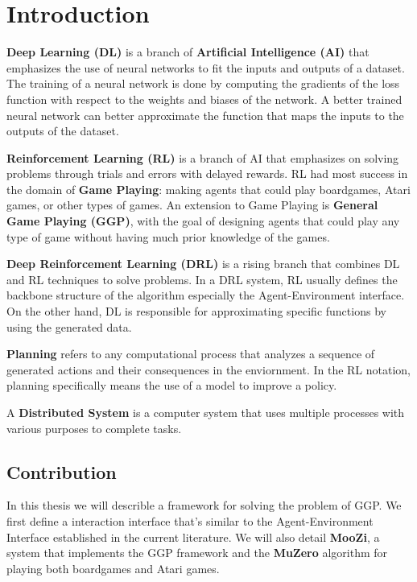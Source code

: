 \documentclass[12pt]{article}
\newcommand{\note}[1]{\todo[color=yellow!40,bordercolor=none,linecolor=black]{#1}}
\begin{document}
\listoftodos

\tableofcontents

\section{Introduction}

\note{8 - 10 pages of introduction}

\textbf{Deep Learning (DL)} is a branch of \textbf{Artificial Intelligence (AI)} that emphasizes the use of neural networks to fit the inputs and outputs of a dataset.
The training of a neural network is done by computing the gradients of the loss function with respect to the weights and biases of the network.
A better trained neural network can better approximate the function that maps the inputs to the outputs of the dataset.

\textbf{Reinforcement Learning (RL)} is a branch of AI that emphasizes on solving problems through trials and errors with delayed rewards.
RL had most success in the domain of \textbf{Game Playing}: making agents that could play boardgames, Atari games, or other types of games.
An extension to Game Playing is \textbf{General Game Playing (GGP)}, with the goal of designing agents that could play any type of game without having much prior knowledge of the games.

\textbf{Deep Reinforcement Learning (DRL)} is a rising branch that combines DL and RL techniques to solve problems.
In a DRL system, RL usually defines the backbone structure of the algorithm especially the Agent-Environment interface.
On the other hand, DL is responsible for approximating specific functions by using the generated data.

\textbf{Planning} refers to any computational process that analyzes a sequence of generated actions and their consequences in the enviornment.
In the RL notation, planning specifically means the use of a model to improve a policy.

A \textbf{Distributed System} is a computer system that uses multiple processes with various purposes to complete tasks.

\subsection{Contribution}
In this thesis we will describle a framework for solving the problem of GGP.
We first define a interaction interface that's similar to the Agent-Environment Interface established in the current literature.
We will also detail \textbf{MooZi}, a system that implements the GGP framework and the \textbf{MuZero} algorithm for playing both boardgames and Atari games.
\end{document}
